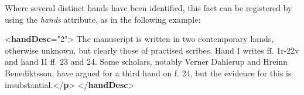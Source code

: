 Where several distinct hands have been identified, this fact can be registered by using the {\itshape hands} attribute, as in the following example: \par\bgroup{}\exampleFont \begin{shaded}\noindent\mbox{}{<\textbf{handDesc}\hspace*{1em}{hands}="{2}">}\mbox{}\newline 
{}The manuscript is written in two contemporary hands, otherwise unknown, but\mbox{}\newline 
\hspace*{1em}\hspace*{1em} clearly those of practised scribes. Hand I writes ff. 1r-22v and hand II ff. 23\mbox{}\newline 
\hspace*{1em}\hspace*{1em} and 24. Some scholars, notably Verner Dahlerup and Hreinn Benediktsson, have\mbox{}\newline 
\hspace*{1em}\hspace*{1em} argued for a third hand on f. 24, but the evidence for this is\mbox{}\newline 
\hspace*{1em}\hspace*{1em} insubstantial.{</\textbf{p}>}\mbox{}\newline 
{</\textbf{handDesc}>}\end{shaded}\egroup\par \par
